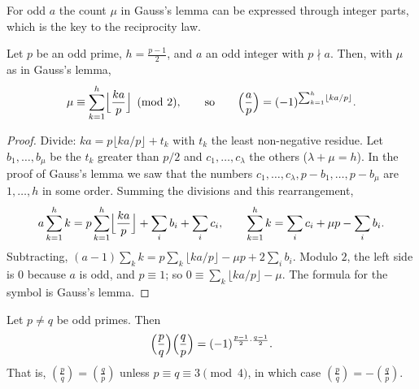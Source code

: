 For odd $a$ the count $\mu$ in Gauss's lemma can be expressed through integer parts, which is the key to the reciprocity law.

\begin{lemma}[Eisenstein]\label{number-theory:lemma-eisenstein}
Let $p$ be an odd prime, $h = \frac{p-1}{2}$, and $a$ an odd integer with $p \nmid a$. Then, with $\mu$ as in Gauss's lemma,
\[
\mu \equiv \sum_{k=1}^{h}\Bigl\lfloor\frac{ka}{p}\Bigr\rfloor \pmod 2, \qquad\text{so}\qquad \Bigl(\frac{a}{p}\Bigr) = (-1)^{\sum_{k=1}^{h}\lfloor ka/p\rfloor} .
\]
\end{lemma}

\begin{proof}
Divide: $ka = p\lfloor ka/p\rfloor + t_k$ with $t_k$ the least non-negative residue. Let $b_1, \ldots, b_\mu$ be the $t_k$ greater than $p/2$ and $c_1, \ldots, c_\lambda$ the others ($\lambda + \mu = h$). In
the proof of Gauss's lemma we saw that the numbers $c_1, \ldots, c_\lambda, p - b_1, \ldots, p - b_\mu$ are $1, \ldots, h$ in some order. Summing the divisions and this rearrangement,
\[
a\sum_{k=1}^{h}k = p\sum_{k=1}^{h}\Bigl\lfloor\frac{ka}{p}\Bigr\rfloor + \sum_ib_i + \sum_ic_i, \qquad \sum_{k=1}^{h}k = \sum_ic_i + \mu p - \sum_ib_i .
\]
Subtracting, $(a - 1)\sum_kk = p\sum_k\lfloor ka/p\rfloor - \mu p + 2\sum_ib_i$. Modulo $2$, the left side is $0$ because $a$ is odd, and $p \equiv 1$; so $0 \equiv \sum_k\lfloor ka/p\rfloor - \mu$. The
formula for the symbol is Gauss's lemma.
\end{proof}

\begin{theorem}\label{number-theory:theorem-quadratic-reciprocity}
Let $p \neq q$ be odd primes. Then
\[
\Bigl(\frac{p}{q}\Bigr)\Bigl(\frac{q}{p}\Bigr) = (-1)^{\frac{p-1}{2}\cdot\frac{q-1}{2}} .
\]
That is, $(\frac{p}{q}) = (\frac{q}{p})$ unless $p \equiv q \equiv 3 \pmod 4$, in which case $(\frac{p}{q}) = -(\frac{q}{p})$.
\end{theorem}

